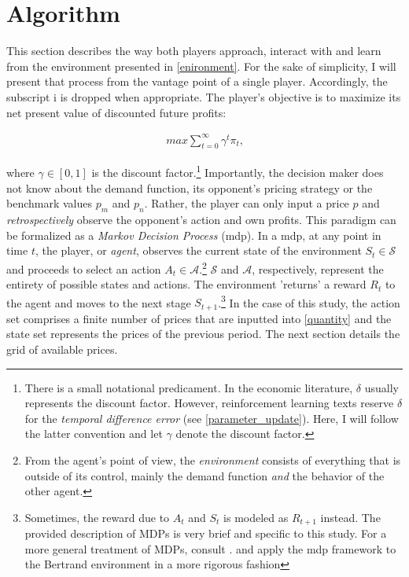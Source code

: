 \section{Algorithm}\label{algorithm}

This section describes the way both players approach, interact with and learn from the environment presented in \autoref{enironment}. For the sake of simplicity, I will present that process from the vantage point of a single player. Accordingly, the subscript {i} is dropped when appropriate. The player's objective is to maximize its net present value of discounted future profits:

\begin{gather}\label{maximization}
max \sum_{t = 0}^{\infty} \gamma^t \pi_{t} \text{,}
\end{gather}

where $\gamma \in [0, 1]$ is the discount factor.\footnote{There is a small notational predicament. In the economic literature, $\delta$ usually represents the discount factor. However, reinforcement learning texts reserve $\delta$ for the \emph{temporal difference error} (see \autoref{parameter_update}). Here, I will follow the latter convention and let $\gamma$ denote the discount factor.} Importantly, the decision maker does not know about the demand function, its opponent's pricing strategy or the benchmark values $p_m$ and $p_n$. Rather, the player can only input a price $p$ and \emph{retrospectively} observe the opponent's action and own profits. This paradigm can be formalized as a \emph{Markov Decision Process} (\gls{mdp}). In a \gls{mdp}, at any point in time $t$, the player, or \emph{agent}, observes the current state of the environment $S_t \in \mathcal{S}$ and proceeds to select an action $A_t \in \mathcal{A}$.\footnote{From the agent's point of view, the \emph{environment} consists of everything that is outside of its control, mainly the demand function \emph{and} the behavior of the other agent.} $\mathcal{S}$ and $\mathcal{A}$, respectively, represent the entirety of possible states and actions. The environment 'returns' a reward $R_t$ to the agent and moves to the next stage $S_{t+1}$.\footnote{Sometimes, the reward due to $A_t$ and $S_t$ is modeled as $R_{t+1}$ instead. The provided description of MDPs is very brief and specific to this study. For a more general treatment of MDPs, consult \textcite{sutton_reinforcement_2018}. \textcite{calvano_artificial_2020} and \textcite{hettich_algorithmic_2021} apply the \gls{mdp} framework to the Bertrand environment in a more rigorous fashion} In the case of this study, the action set comprises a finite number of prices that are inputted into \autoref{quantity} and the state set represents the prices of the previous period. The next section details the grid of available prices.

